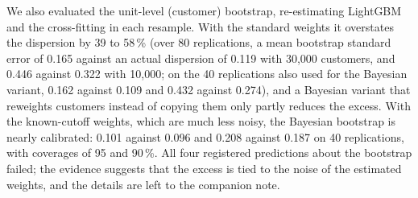 We also evaluated the unit-level (customer) bootstrap, re-estimating LightGBM and the cross-fitting in each resample. With the standard weights it overstates the dispersion by 39 to 58\,\% (over 80 replications, a mean bootstrap standard error of 0.165 against an actual dispersion of 0.119 with 30{,}000 customers, and 0.446 against 0.322 with 10{,}000; on the 40 replications also used for the Bayesian variant, 0.162 against 0.109 and 0.432 against 0.274), and a Bayesian variant that reweights customers instead of copying them only partly reduces the excess. With the known-cutoff weights, which are much less noisy, the Bayesian bootstrap is nearly calibrated: 0.101 against 0.096 and 0.208 against 0.187 on 40 replications, with coverages of 95 and 90\,\%. All four registered predictions about the bootstrap failed; the evidence suggests that the excess is tied to the noise of the estimated weights, and the details are left to the companion note.

